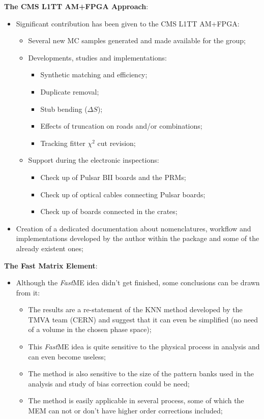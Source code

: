 {\flushleft \textbf{The CMS L1TT AM+FPGA Approach}:}
\begin{itemize}
	\item Significant contribution has been given to the CMS L1TT AM+FPGA:
	\begin{itemize}
		\item Several new MC samples generated and made available for the group;
		\item Developments, studies and implementations:
		\begin{itemize}
			\item Synthetic matching and efficiency;
			\item Duplicate removal;
			\item Stub bending ($\Delta S$);
			\item Effects of truncation on roads and/or combinations;
			\item Tracking fitter $\chi^{2}$ cut revision;
		\end{itemize}
		\item Support during the electronic inspections:
		\begin{itemize}
			\item Check up of Pulsar BII boards and the PRMs;
			\item Check up of optical cables connecting Pulsar boards;
			\item Check up of boards connected in the crates;
		\end{itemize}
	\end{itemize}
\end{itemize}
\begin{itemize}
	\item Creation of a dedicated documentation about nomenclatures, workflow and implementations developed by the author within the package and some of the already existent ones;
\end{itemize}


{\flushleft \textbf{The Fast Matrix Element}:}
\begin{itemize}
	\item Although the \textit{Fast}ME idea didn't get finished, some conclusions can be drawn from it:
	\begin{itemize}
		\item The results are a re-statement of the KNN method developed by the TMVA team (CERN) and suggest that it can even be simplified (no need of a volume in the chosen phase space);
		\item This \textit{Fast}ME idea is quite sensitive to the physical process in analysis and can even become useless;
		\item The method is also sensitive to the size of the pattern banks used in the analysis and study of bias correction could be need;
		\item The method is easily applicable in several process, some of which the MEM can not or don't have higher order corrections included;
	\end{itemize}
\end{itemize}
	

